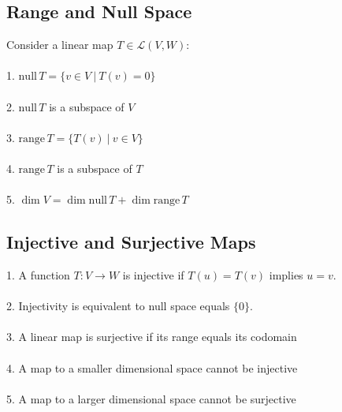\documentclass[11pt,reqno]{article}
\newcommand{\range}{\mathrm{range\,}}
\newcommand{\nul}{\mathrm{null\,}}
\theoremstyle{definition}
\begin{document}
\subsection*{Range and Null Space}
Consider a linear map $T\in\mathcal{L}(V, W)$:\\\\
1. $\nul T = \{v\in V\ |\ T(v) = 0\}$\\\\
2. $\nul T$ is a subspace of $V$\\\\
3. $\range T = \{T(v)\ |\ v\in V\}$\\\\
4. $\range T$ is a subspace of $T$\\\\
5. $\dim V = \dim\nul T + \dim\range T$

\subsection*{Injective and Surjective Maps}
1. A function $T: V\rightarrow W$ is injective if $T(u) = T(v)$ implies $u = v$.\\\\
2. Injectivity is equivalent to null space equals $\{0\}$.\\\\
3. A linear map is surjective if its range equals its codomain\\\\
4. A map to a smaller dimensional space cannot be injective\\\\
5. A map to a larger dimensional space cannot be surjective
\end{document}
